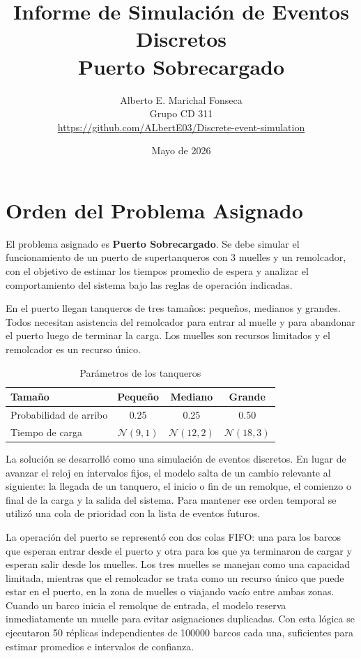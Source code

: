 \documentclass[12pt]{article}
\title{Informe de Simulación de Eventos Discretos\\Puerto Sobrecargado}
\author{Alberto E. Marichal Fonseca\\Grupo CD 311 \\ \url{https://github.com/ALbertE03/Discrete-event-simulation} }
\date{Mayo de 2026}
\begin{document}
\maketitle

\section{Orden del Problema Asignado}

El problema asignado es \textbf{Puerto Sobrecargado}. Se debe simular el funcionamiento de un puerto de supertanqueros con 3 muelles y un remolcador, con el objetivo de estimar los tiempos promedio de espera y analizar el comportamiento del sistema bajo las reglas de operación indicadas.

En el puerto llegan tanqueros de tres tamaños: pequeños, medianos y grandes. Todos necesitan asistencia del remolcador para entrar al muelle y para abandonar el puerto luego de terminar la carga. Los muelles son recursos limitados y el remolcador es un recurso único.

\begin{table}[H]
\centering
\caption{Parámetros de los tanqueros}
\begin{tabular}{lccc}
\toprule
\textbf{Tamaño} & \textbf{Pequeño} & \textbf{Mediano} & \textbf{Grande} \\
\midrule
Probabilidad de arribo & 0.25 & 0.25 & 0.50 \\
Tiempo de carga & $\mathcal{N}(9, 1)$ & $\mathcal{N}(12, 2)$ & $\mathcal{N}(18, 3)$ \\
\bottomrule
\end{tabular}
\end{table}


La solución se desarrolló como una simulación de eventos discretos. En lugar de avanzar el reloj en intervalos fijos, el modelo salta de un cambio relevante al siguiente: la llegada de un tanquero, el inicio o fin de un remolque, el comienzo o final de la carga y la salida del sistema. Para mantener ese orden temporal se utilizó una cola de prioridad con la lista de eventos futuros.

La operación del puerto se representó con dos colas FIFO: una para los barcos que esperan entrar desde el puerto y otra para los que ya terminaron de cargar y esperan salir desde los muelles. Los tres muelles se manejan como una capacidad limitada, mientras que el remolcador se trata como un recurso único que puede estar en el puerto, en la zona de muelles o viajando vacío entre ambas zonas. Cuando un barco inicia el remolque de entrada, el modelo reserva inmediatamente un muelle para evitar asignaciones duplicadas. Con esta lógica se ejecutaron 50 réplicas independientes de 100000 barcos cada una, suficientes para estimar promedios e intervalos de confianza.
\end{document}
